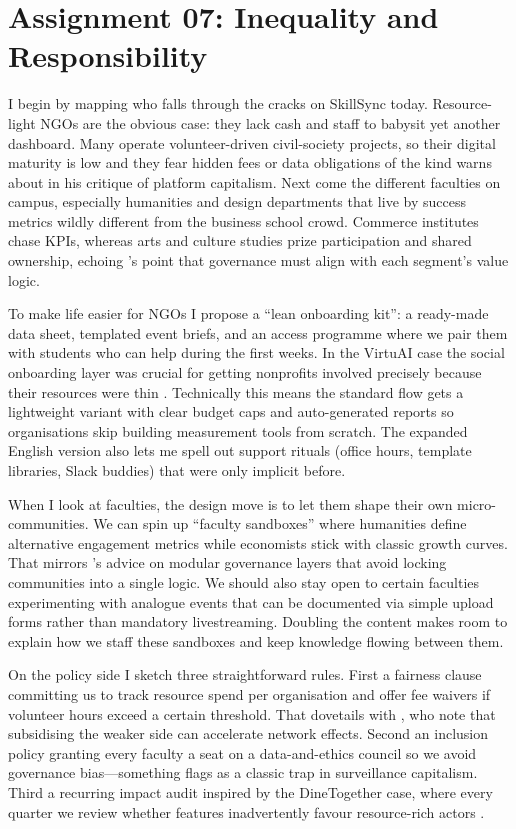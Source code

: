 \section*{Assignment 07: Inequality and Responsibility}

I begin by mapping who falls through the cracks on SkillSync today. Resource-light NGOs are the obvious case: they lack cash and staff to babysit yet another dashboard. Many operate volunteer-driven civil-society projects, so their digital maturity is low and they fear hidden fees or data obligations of the kind \citet{Srnicek2017} warns about in his critique of platform capitalism. Next come the different faculties on campus, especially humanities and design departments that live by success metrics wildly different from the business school crowd. Commerce institutes chase KPIs, whereas arts and culture studies prize participation and shared ownership, echoing \citet{Choudary2016}'s point that governance must align with each segment’s value logic.

To make life easier for NGOs I propose a ``lean onboarding kit'': a ready-made data sheet, templated event briefs, and an access programme where we pair them with students who can help during the first weeks. In the VirtuAI case the social onboarding layer was crucial for getting nonprofits involved precisely because their resources were thin \citep{Gunasilan2024}. Technically this means the standard flow gets a lightweight variant with clear budget caps and auto-generated reports so organisations skip building measurement tools from scratch. The expanded English version also lets me spell out support rituals (office hours, template libraries, Slack buddies) that were only implicit before.

When I look at faculties, the design move is to let them shape their own micro-communities. We can spin up ``faculty sandboxes'' where humanities define alternative engagement metrics while economists stick with classic growth curves. That mirrors \citet{Reillier2017}'s advice on modular governance layers that avoid locking communities into a single logic. We should also stay open to certain faculties experimenting with analogue events that can be documented via simple upload forms rather than mandatory livestreaming. Doubling the content makes room to explain how we staff these sandboxes and keep knowledge flowing between them.

On the policy side I sketch three straightforward rules. First a fairness clause committing us to track resource spend per organisation and offer fee waivers if volunteer hours exceed a certain threshold. That dovetails with \citet{ShapiroVarian1999}, who note that subsidising the weaker side can accelerate network effects. Second an inclusion policy granting every faculty a seat on a data-and-ethics council so we avoid governance bias---something \citet{Zuboff2019} flags as a classic trap in surveillance capitalism. Third a recurring impact audit inspired by the DineTogether case, where every quarter we review whether features inadvertently favour resource-rich actors \citep{Rennella2023}.

